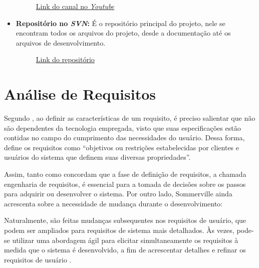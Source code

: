 \begin{itemize}
    \begin{figure}[htb]
    \centering
    \caption{\href{https://www.youtube.com/channel/UCOJVZlclPTqngZQwPS9Fvpg}{Link do canal no \textit{Youtube}}}
    \end{figure}
    \FloatBarrier
    \item \textbf{Repositório no \textit{SVN}:} É o repositório principal do projeto, nele se encontram todos os arquivos do projeto, desde a documentação até os arquivos de desenvolvimento. 
    
    \begin{figure}[htb]
    \centering
    \caption{\href{https://svn.spo.ifsp.edu.br/svn/a6pgp/A2022-PDS-SEG/Bunka_Bytes/}{Link do repositório}}
    \end{figure}
    \FloatBarrier
\end{itemize}



\section{Análise de Requisitos}
Segundo , ao definir as características de um requisito, é preciso salientar que não são dependentes da tecnologia empregada, visto que suas especificações estão contidas no campo do cumprimento das necessidades do usuário. Dessa forma,   define os requisitos como ``objetivos ou restrições estabelecidas por clientes e usuários do sistema que definem suas diversas propriedades''.

Assim, tanto  como  concordam que a fase de definição de requisitos, a chamada engenharia de requisitos, é essencial para a tomada de decisões sobre os passos para adquirir ou desenvolver o sistema. Por outro lado, Sommerville ainda acrescenta sobre a necessidade de mudança durante o desenvolvimento:

\begin{citacao}
Naturalmente, são feitas mudanças subsequentes nos requisitos de usuário, que podem ser ampliados para requisitos de sistema mais detalhados. Às vezes, pode-se utilizar uma abordagem ágil para elicitar simultaneamente os requisitos à medida que o sistema é desenvolvido, a fim de acrescentar detalhes e refinar os requisitos de usuário \cite{SOMMERVILLE:2019}.
\end{citacao}

